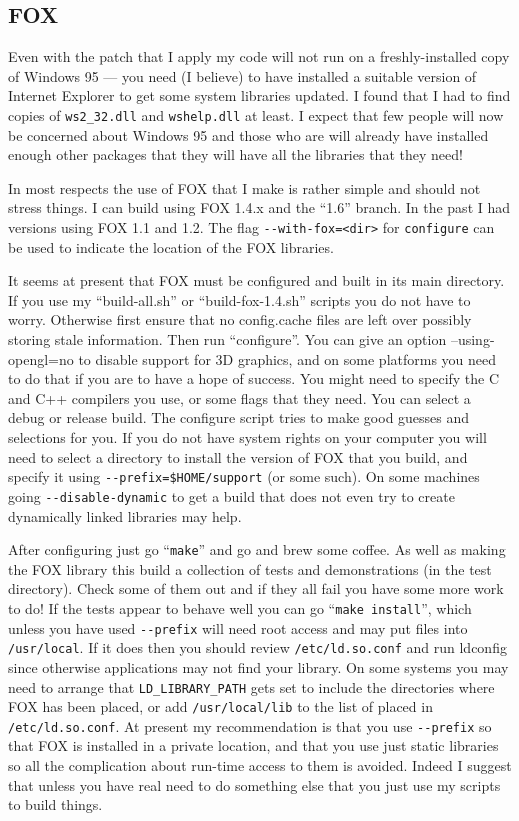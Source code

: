 \documentclass[11pt]{article}
\begin{document}
\subsection{FOX}
Even with the patch that I apply my code will not run on
a freshly-installed copy of Windows 95 --- you need (I believe) to have
installed a suitable version of Internet Explorer to get some system
libraries updated. I found that I had to find copies of \verb+ws2_32.dll+
and \verb+wshelp.dll+ at least. I expect that few people will now be
concerned about Windows 95 and those who are will already have installed
enough other packages that they will have all the libraries that they need!


In most respects the use of FOX that I make is rather simple and should
not stress things. I can build using FOX 1.4.x and the ``1.6'' branch.
In the past I had versions using FOX 1.1 and 1.2.
The flag \verb+--with-fox=<dir>+
for \verb+configure+ can be used to indicate the location
of the FOX libraries. 

It seems at present that FOX must be configured and built in its main
directory. If you use my ``build-all.sh'' or ``build-fox-1.4.sh'' scripts
you do not have to worry. Otherwise first ensure that no config.cache files
are left over possibly storing stale information. Then run ``configure''.
You can give an option --using-opengl=no to disable support for 3D graphics,
and on some platforms you need to do that if you are to have a hope of
success. You might need to specify the C and C++ compilers you use, or some
flags that they need. You can select a debug or release build. The
configure script tries to make good guesses and selections for you.
If you do not have system rights on your computer you will need to
select a directory to install the version of FOX that you build, and
specify it using \verb+--prefix=$HOME/support+ (or some such). On some
machines going \verb+--disable-dynamic+ to get a build that does not even try
to create dynamically linked libraries may help.

After configuring just go ``\verb+make+'' and go and brew some coffee. 
As well as making the FOX library this build a collection of tests and
demonstrations (in the test directory). Check some of them out and if
they all fail you have some more work to do! If the tests appear to behave
well you can go ``\verb+make install+'', which unless you have used
\verb+--prefix+ will need root access and may put files
into \verb+/usr/local+. If it does then you should review
\verb+/etc/ld.so.conf+ and run ldconfig since otherwise applications may
not find your library. On some systems you may need to arrange that
\verb+LD_LIBRARY_PATH+ gets set to include the directories where FOX has
been placed, or add \verb+/usr/local/lib+ to the list of placed in
\verb+/etc/ld.so.conf+. At present my recommendation is that you use
\verb+--prefix+ so that FOX is installed in a private location, and that you
use just static libraries so all the complication about run-time access to
them is avoided. Indeed I suggest that unless you have real need to do
something else that you just use my scripts to build things.
\end{document}
